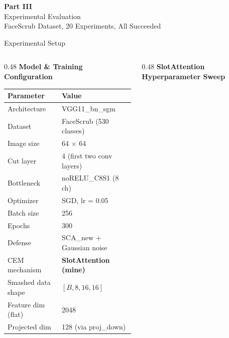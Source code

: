 \documentclass[aspectratio=169, 10pt]{beamer}
\begin{document}
\begin{frame}{}
\vfill
\begin{center}
{\Huge\textbf{Part III}}\\[0.3cm]
{\Large Experimental Evaluation}\\[0.2cm]
{\normalsize FaceScrub Dataset, 20 Experiments, All Succeeded}
\end{center}
\vfill
\end{frame}

\begin{frame}{Experimental Setup}

\begin{columns}[T]
\begin{column}{0.48\textwidth}
\textbf{Model \& Training Configuration}

\vspace{0.1cm}
\footnotesize
\begin{tabular}{ll}
\toprule
\textbf{Parameter} & \textbf{Value} \\
\midrule
Architecture & VGG11\_bn\_sgm \\
Dataset & FaceScrub (530 classes) \\
Image size & 64 $\times$ 64 \\
Cut layer & 4 (first two conv layers) \\
Bottleneck & noRELU\_C8S1 (8 ch) \\
Optimizer & SGD, lr = 0.05 \\
Batch size & 256 \\
Epochs & 300 \\
Defense & SCA\_new + Gaussian noise \\
CEM mechanism & \textbf{SlotAttention (mine)} \\
\midrule
Smashed data shape & $[B, 8, 16, 16]$ \\
Feature dim (flat) & 2048 \\
Projected dim & 128 (via proj\_down) \\
\bottomrule
\end{tabular}
\end{column}
\begin{column}{0.48\textwidth}
\textbf{SlotAttention Hyperparameter Sweep}


\end{column}
\end{columns}
\end{frame}
\end{document}
